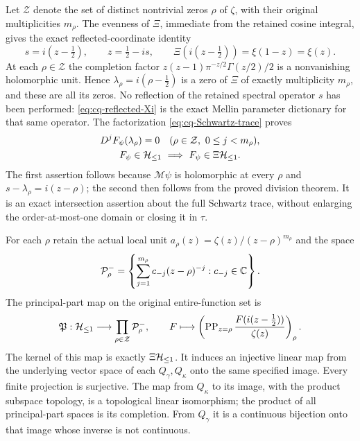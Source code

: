 Let $\mathcal Z$ denote the set of distinct nontrivial zeros $\rho$
of $\zeta$, with their original multiplicities $m_\rho$.
The evenness of $\Xi$, immediate from the retained cosine integral,
gives the exact reflected-coordinate identity
\begin{equation}\label{eq:cq-reflected-Xi}
 s=i(z-\tfrac12),\qquad z=\tfrac12-is,\qquad
 \Xi(i(z-\tfrac12))=\xi(1-z)=\xi(z).
\end{equation}
At each $\rho\in\mathcal Z$ the completion factor
$z(z-1)\pi^{-z/2}\Gamma(z/2)/2$ is a nonvanishing holomorphic
unit. Hence $\lambda_\rho=i(\rho-\tfrac12)$ is a zero of
$\Xi$ of exactly multiplicity $m_\rho$, and these are all its
zeros. No reflection of the retained spectral operator $s$ has
been performed: \eqref{eq:cq-reflected-Xi} is the exact Mellin
parameter dictionary for that same operator. The factorization
\eqref{eq:cq-Schwartz-trace} proves
\begin{equation}\label{eq:cq-fulltrace-jets}
 \begin{gathered}
 D^jF_\psi(\lambda_\rho)=0
 \quad(\rho\in\mathcal Z,\ 0\leq j<m_\rho),\\
 F_\psi\in\mathcal H_{\leq 1}\ \Longrightarrow\ F_\psi\in\Xi\mathcal H_{\leq 1}.
 \end{gathered}
\end{equation}
The first assertion follows because $\mathcal M\psi$ is holomorphic
at every $\rho$ and $s-\lambda_\rho=i(z-\rho)$; the second
then follows from the proved division theorem. It is an exact
intersection assertion about the full Schwartz trace, without
enlarging the order-at-most-one domain or closing it in $\tau$.

For each $\rho$ retain the actual local unit
$a_\rho(z)=\zeta(z)/(z-\rho)^{m_\rho}$ and the space
\[
 \mathcal P_\rho^-=
  \left\{\sum_{j=1}^{m_\rho}c_{-j}(z-\rho)^{-j}:c_{-j}\in\mathbb C\right\}.
\]
The principal-part map on the original entire-function set is
\begin{equation}\label{eq:cq-principalparts}
 \mathfrak P:\mathcal H_{\leq 1}\longrightarrow\prod_{\rho\in\mathcal Z}\mathcal P_\rho^-,
 \qquad
 F\longmapsto\left(\operatorname{PP}_{z=\rho}
                 \frac{F(i(z-\tfrac12))}{\zeta(z)}\right)_\rho.
\end{equation}
The kernel of this map is exactly $\Xi\mathcal H_{\leq 1}$. It induces an
injective linear map from the underlying vector space of each
$Q_\gamma,Q_\kappa$ onto the same specified image. Every finite
projection is surjective. The map from $Q_\kappa$ to its image,
with the product subspace topology, is a topological linear
isomorphism; the product of all principal-part spaces is its
completion. From $Q_\gamma$ it is a continuous bijection onto
that image whose inverse is not continuous.

